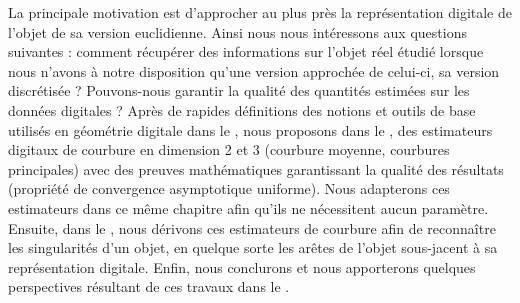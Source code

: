 La principale motivation est d'approcher au plus près la représentation digitale
de l'objet de sa version euclidienne. Ainsi nous nous intéressons aux questions
suivantes : comment récupérer des informations sur l'objet réel étudié lorsque
nous n'avons à notre disposition qu'une version approchée de celui-ci, sa
version discrétisée ? Pouvons-nous garantir la qualité des quantités estimées
sur les données digitales ? Après de rapides définitions des notions et outils
de base utilisés en géométrie digitale dans le , nous
proposons dans le , des estimateurs digitaux de
courbure en dimension 2 et 3 (courbure moyenne, courbures principales) avec des
preuves mathématiques garantissant la qualité des résultats (propriété de
convergence asymptotique uniforme). Nous adapterons ces estimateurs dans ce même
chapitre afin qu'ils ne nécessitent aucun paramètre. Ensuite, dans le
, nous dérivons ces estimateurs de courbure afin
de reconnaître les singularités d'un objet, en quelque sorte les arêtes de
l'objet sous-jacent à sa représentation digitale. Enfin, nous conclurons et nous
apporterons quelques perspectives résultant de ces travaux dans le
.
%
%
%
%
%
%
%
